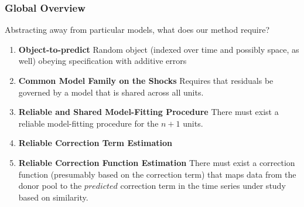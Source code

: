 \documentclass[9pt]{beamer}
\newcommand{\x}{\textbf{x}}
\theoremstyle{definition}
\begin{document}

    
    

\begin{frame}\frametitle{Global Overview}

    Abstracting away from particular models, what does our method require?

    \begin{enumerate}
        \item <1-> \textbf{Object-to-predict}
       Random object (indexed over time and possibly space, as well) obeying specification with additive errors 
            
      \item <2-> \textbf{Common Model Family on the Shocks} Requires that residuals be governed by a model that is shared across all units.  
      
      \item<3->  \textbf{Reliable and Shared Model-Fitting Procedure} There must exist a reliable model-fitting procedure for the $n+1$ units.
      
      \item<4-> \textbf{Reliable Correction Term Estimation} 

      \item<5->  \textbf{Reliable Correction Function Estimation} There must exist a correction function (presumably based on the correction term) that maps data from the donor pool to the $\textit{predicted}$ correction term in the time series under study based on similarity.  
    \end{enumerate}
\end{frame}
\end{document}
